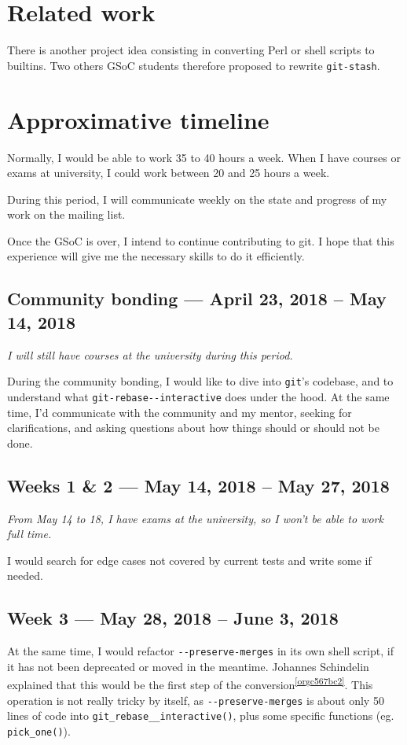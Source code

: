 \documentclass[11pt]{article}
\begin{document}
\section{Related work}
\label{sec:org2372035}
There is another project idea consisting in converting Perl or shell
scripts to builtins. Two others GSoC students therefore proposed to
rewrite \texttt{git-stash}.

\section{Approximative timeline}
\label{sec:orgf589a8a}
Normally, I would be able to work 35 to 40 hours a week. When I have
courses or exams at university, I could work between 20 and 25 hours a
week.

During this period, I will communicate weekly on the state and
progress of my work on the mailing list.

Once the GSoC is over, I intend to continue contributing to git. I
hope that this experience will give me the necessary skills to do it
efficiently.

\subsection{Community bonding --- April 23, 2018 -- May 14, 2018}
\label{sec:org13264bc}
\emph{I will still have courses at the university during this period.}

During the community bonding, I would like to dive into \texttt{git}'s
codebase, and to understand what \texttt{git-rebase-{}-interactive} does under
the hood. At the same time, I’d communicate with the community and my
mentor, seeking for clarifications, and asking questions about how
things should or should not be done.

\subsection{Weeks 1 \& 2 --- May 14, 2018 -- May 27, 2018}
\label{sec:org4233208}
\emph{From May 14 to 18, I have exams at the university, so I won’t be able
to work full time.}

I would search for edge cases not covered by current tests and write
some if needed.

\subsection{Week 3 --- May 28, 2018 -- June 3, 2018}
\label{sec:org74bc13c}
At the same time, I would refactor \texttt{-{}-preserve-merges} in its own
shell script, if it has not been deprecated or moved in the
meantime. Johannes Schindelin explained that this would be the first
step of the conversion\textsuperscript{\ref{orgc567bc2}}. This operation is not really
tricky by itself, as \texttt{-{}-preserve-merges} is about only 50 lines of
code into \texttt{git\_rebase\_\_interactive()}, plus some specific functions
(eg. \texttt{pick\_one()}).
\end{document}

